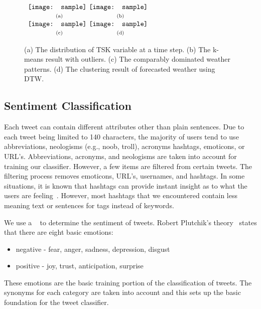 \begin{figure}[t]
\begin{center}
$\begin{array}{c@{\hspace{0.01\linewidth}}c}
\texttt{[image: sample]} &
\texttt{[image: sample]}
\\
\mbox{\small{(a)}} & \mbox{\small{(b)}}
\\
\texttt{[image: sample]} &
\texttt{[image: sample]}
\\
\mbox{\small{(c)}} & \mbox{\small{(d)}}
\end{array}$
\end{center}
\vspace{-.1in}
\caption{(a) The distribution of TSK variable at a time step. (b) The k-means result with outliers. (c) The comparably dominated weather patterns. (d) The clustering result of forecasted weather using DTW. }
\label{fig:clustering}
\end{figure}

\subsection{Sentiment Classification}
\label{sec:senti}

Each tweet can contain different attributes other than plain sentences. Due to each tweet being limited to 140 characters, the majority of users tend to use abbreviations, neologisms (e.g., noob, troll), acronyms hashtags, emoticons, or URL's. Abbreviations, acronyms, and neologisms are taken into account for training our classifier. However, a few items are filtered from certain tweets. The filtering process removes emoticons, URL's, usernames, and hashtags. In some situations, it is known that hashtags can provide instant insight as to what the users are feeling~\cite{keller2005warm}. However, most hashtags that we encountered contain less meaning text or sentences for tags instead of keywords.

We use a ~\cite{keller2005warm} to determine the sentiment of tweets. Robert Plutchik's theory~\cite{Plutchik2002} states that there are eight basic emotions:
\begin{itemize}
\vspace{-0.05in}
\setlength{\topsep}{-0.1in}
\setlength{\itemsep}{-0.05in}
\item negative - fear, anger, sadness, depression, disgust
\item positive - joy, trust, anticipation, surprise
\end{itemize}
\vspace{-0.05in}
These emotions are the basic training portion of the classification of tweets. The synonyms for each category are taken into account and this sets up the basic foundation for the tweet classifier.

